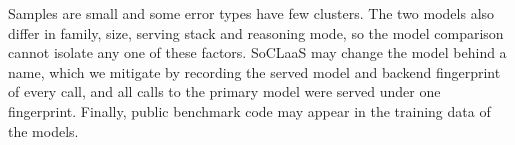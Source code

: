 Samples are small and some error types have few clusters. The two models also differ in family, size, serving stack and reasoning mode, so the model comparison cannot isolate any one of these factors. SoCLaaS may change the model behind a name, which we mitigate by recording the served model and backend fingerprint of every call, and all calls to the primary model were served under one fingerprint. Finally, public benchmark code may appear in the training data of the models.
